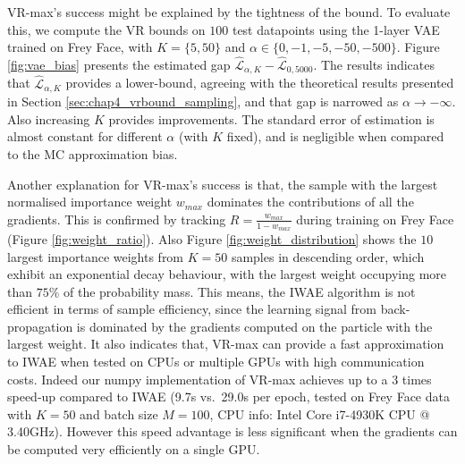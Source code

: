 VR-max's success might be explained by the tightness of the bound. To evaluate this, we compute the VR bounds on $100$ test datapoints using the 1-layer VAE trained on Frey Face, with $K=\{5, 50\}$ and $\alpha \in \{0, -1, -5, -50, -500 \}$. Figure \ref{fig:vae_bias} presents the estimated gap $\hat{\mathcal{L}}_{\alpha, K} - \hat{\mathcal{L}}_{0, 5000}$. The results indicates that $\hat{\mathcal{L}}_{\alpha, K}$ provides a lower-bound, agreeing with the theoretical results presented in Section \ref{sec:chap4_vrbound_sampling}, and that gap is narrowed as $\alpha \rightarrow -\infty$. Also increasing $K$ provides improvements. The standard error of estimation is almost constant for different $\alpha$ (with $K$ fixed), and is negligible when compared to the MC approximation bias.

%
Another explanation for VR-max's success is that, the sample with the largest normalised importance weight $w_{max}$ dominates the contributions of all the gradients.
This is confirmed by tracking $R = \frac{w_{max}}{1 - w_{max}}$ during training on Frey Face (Figure \ref{fig:weight_ratio}). Also Figure \ref{fig:weight_distribution} shows the $10$ largest importance weights from $K=50$ samples in descending order, which exhibit an exponential decay behaviour, with the largest weight occupying more than $75\%$ of the probability mass. This means, the IWAE algorithm is not efficient in terms of sample efficiency, since the learning signal from back-propagation is dominated by the gradients computed on the particle with the largest weight.
%
It also indicates that, VR-max can provide a fast approximation to IWAE when tested on CPUs or multiple GPUs with high communication costs. Indeed our numpy implementation of VR-max achieves up to a 3 times speed-up compared to IWAE (9.7s vs.~29.0s per epoch, tested on Frey Face data with $K = 50$ and batch size $M = 100$, CPU info: Intel Core i7-4930K CPU @ 3.40GHz). However this speed advantage is less significant when the gradients can be computed very efficiently on a single GPU.